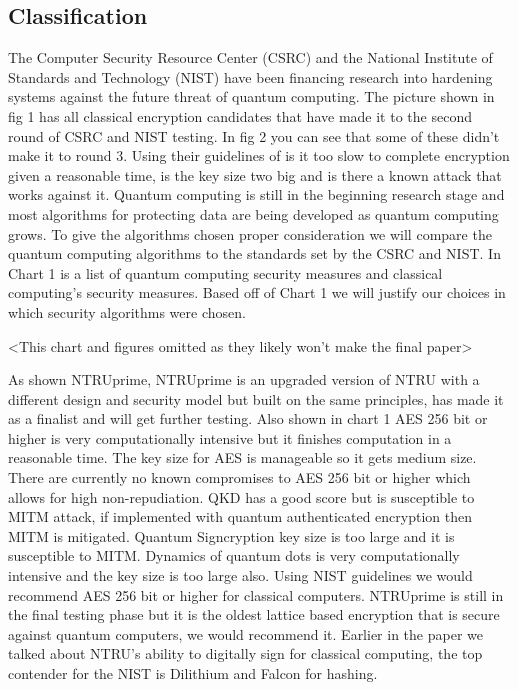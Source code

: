 \documentclass[sigconf]{acmart}
\begin{document}
\subsection{Classification} %
The Computer Security Resource Center (CSRC) and the National Institute of Standards and Technology (NIST) have been financing research into hardening systems against the future threat of quantum computing. The picture shown in fig 1 has all classical encryption candidates that have made it to the second round of CSRC and NIST testing. In fig 2 you can see that some of these didn’t make it to round 3. Using their guidelines of is it too slow to complete encryption given a reasonable time, is the key size two big and is there a known attack that works against it. Quantum computing is still in the beginning research stage and most algorithms for protecting data are being developed as quantum computing grows. To give the algorithms chosen proper consideration we will compare the quantum computing algorithms to the standards set by the CSRC and NIST. In Chart 1 is a list of quantum computing security measures and classical computing’s security measures. Based off of Chart 1 we will justify our choices in which security algorithms were chosen.

<This chart and figures omitted as they likely won't make the final paper>

As shown NTRUprime, NTRUprime is an upgraded version of NTRU with a different design and security model but built on the same principles, has made it as a finalist and will get further testing. Also shown in chart 1 AES 256 bit or higher is very computationally intensive but it finishes computation in a reasonable time. The key size for AES is manageable so it gets medium size. There are currently no known compromises to AES 256 bit or higher which allows for high non-repudiation. QKD has a good score but is susceptible to MITM attack, if implemented with quantum authenticated encryption then MITM is mitigated. Quantum Signcryption key size is too large and it is susceptible to MITM. Dynamics of quantum dots is very computationally intensive and the key size is too large also. Using NIST guidelines we would recommend AES 256 bit or higher for classical computers. NTRUprime is still in the final testing phase but it is the oldest lattice based encryption that is secure against quantum computers, we would recommend it. Earlier in the paper we talked about NTRU’s ability to digitally sign for classical computing, the top contender for the NIST is Dilithium and Falcon for hashing.
\end{document}
